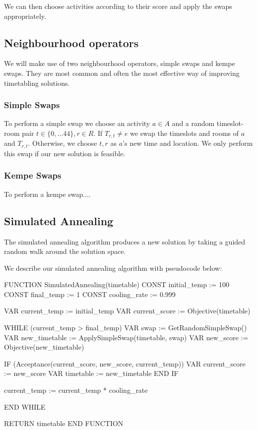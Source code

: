 \documentclass[12pt]{article}
\theoremstyle{definition}
\theoremstyle{plain}
\begin{document}
We can then choose activities according to their score and apply the swaps appropriately.

\subsection{Neighbourhood operators}
We will make use of two neighbourhood operators, simple swaps and kempe swaps. They are most common and often the most effective way of improving timetabling solutions.

\subsubsection{Simple Swaps}
To perform a simple swap we choose an activity $a \in A$ and a random timeslot-room pair $t \in \{0, \dots 44\}, r \in R$. If $T_{r,t} \neq e$ we swap the timeslots and rooms of $a$ and $T_{r,t}$. Otherwise, we choose $t, r$ as $a$'s new time and location. We only perform this swap if our new solution is feasible.

\subsubsection{Kempe Swaps}
To perform a kempe swap....

\subsection{Simulated Annealing}

The simulated annealing algorithm produces a new solution by taking a guided random walk around the solution space.

We describe our simulated annealing algorithm with pseudocode below:

\begin{pseudo}
	FUNCTION SimulatedAnnealing(timetable)
		CONST initial_temp := 100
		CONST final_temp   := 1
		CONST cooling_rate := 0.999
		
		VAR current_temp := initial_temp
		VAR current_score := Objective(timetable)
		
		WHILE (current_temp > final_temp)
			VAR swap := GetRandomSimpleSwap()
			VAR new_timetable := ApplySimpleSwap(timetable, swap)
			VAR new_score := Objective(new_timetable)
			
			IF (Acceptance(current_score, new_score, current_temp))
				VAR current_score := new_score
				VAR timetable := new_timetable
			END IF
			
			current_temp := current_temp * cooling_rate
			
		END WHILE
		
		RETURN timetable
	END FUNCTION
	
\end{pseudo}
\end{document}
